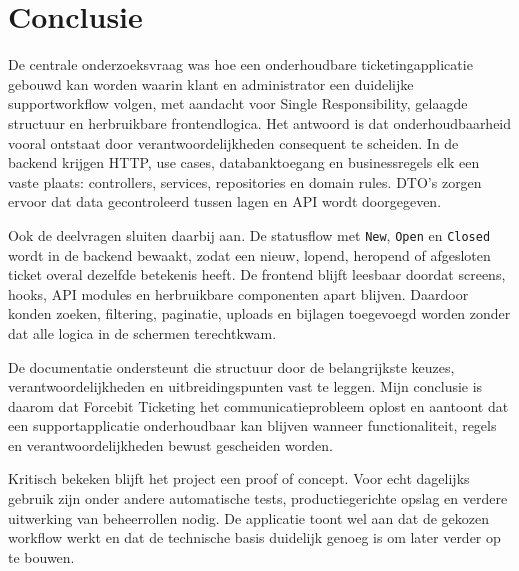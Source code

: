 
\chapter{Conclusie}%
\label{ch:conclusie}


De centrale onderzoeksvraag was hoe een onderhoudbare ticketingapplicatie gebouwd kan worden waarin klant en administrator een duidelijke supportworkflow volgen, met aandacht voor Single Responsibility, gelaagde structuur en herbruikbare frontendlogica. Het antwoord is dat onderhoudbaarheid vooral ontstaat door verantwoordelijkheden consequent te scheiden. In de backend krijgen HTTP, use cases, databanktoegang en businessregels elk een vaste plaats: controllers, services, repositories en domain rules. DTO's zorgen ervoor dat data gecontroleerd tussen lagen en API wordt doorgegeven.

Ook de deelvragen sluiten daarbij aan. De statusflow met \texttt{New}, \texttt{Open} en \texttt{Closed} wordt in de backend bewaakt, zodat een nieuw, lopend, heropend of afgesloten ticket overal dezelfde betekenis heeft. De frontend blijft leesbaar doordat screens, hooks, API modules en herbruikbare componenten apart blijven. Daardoor konden zoeken, filtering, paginatie, uploads en bijlagen toegevoegd worden zonder dat alle logica in de schermen terechtkwam.

De documentatie ondersteunt die structuur door de belangrijkste keuzes, verantwoordelijkheden en uitbreidingspunten vast te leggen. Mijn conclusie is daarom dat Forcebit Ticketing het communicatieprobleem oplost en aantoont dat een supportapplicatie onderhoudbaar kan blijven wanneer functionaliteit, regels en verantwoordelijkheden bewust gescheiden worden.

Kritisch bekeken blijft het project een proof of concept. Voor echt dagelijks gebruik zijn onder andere automatische tests, productiegerichte opslag en verdere uitwerking van beheerrollen nodig. De applicatie toont wel aan dat de gekozen workflow werkt en dat de technische basis duidelijk genoeg is om later verder op te bouwen.
